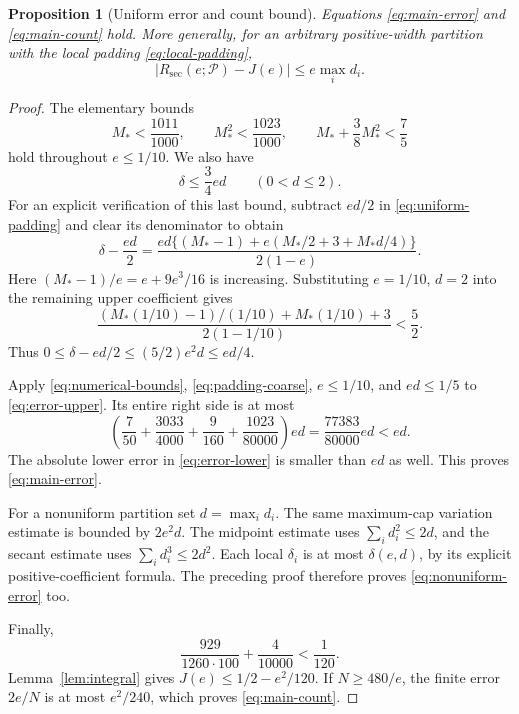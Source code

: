 \documentclass[11pt]{amsart}
\newtheorem{proposition}[theorem]{Proposition}
\theoremstyle{definition}
\theoremstyle{remark}
\newcommand{\Rsec}{R_{\mathrm{sec}}}
\begin{document}
\begin{proposition}[Uniform error and count bound]\label{prop:uniform}
Equations \eqref{eq:main-error} and \eqref{eq:main-count} hold. More
generally, for an arbitrary positive-width partition with the local
padding \eqref{eq:local-padding},
\begin{equation}\label{eq:nonuniform-error}
 |\Rsec(e;\mathcal P)-J(e)|\le e\max_i d_i.
\end{equation}
\end{proposition}
\begin{proof}
The elementary bounds
\begin{equation}\label{eq:numerical-bounds}
 M_*<\frac{1011}{1000},\qquad M_*^2<\frac{1023}{1000},
 \qquad M_*+\frac38M_*^2<\frac75
\end{equation}
hold throughout $e\le1/10$. We also have
\begin{equation}\label{eq:padding-coarse}
 \delta\le\frac34ed\qquad(0<d\le2).
\end{equation}
For an explicit verification of this last bound, subtract $ed/2$ in
\eqref{eq:uniform-padding} and clear its denominator to obtain
\[
 \delta-\frac{ed}{2}
 =\frac{ed\{(M_*-1)+e(M_*/2+3+M_*d/4)\}}{2(1-e)}.
\]
Here $(M_*-1)/e=e+9e^3/16$ is increasing. Substituting
$e=1/10$, $d=2$ into the remaining upper coefficient gives
\[
 \frac{(M_*(1/10)-1)/(1/10)+M_*(1/10)+3}{2(1-1/10)}
 <\frac52.
\]
Thus $0\le\delta-ed/2\le(5/2)e^2d\le ed/4$.

Apply \eqref{eq:numerical-bounds}, \eqref{eq:padding-coarse},
$e\le1/10$, and $ed\le1/5$ to \eqref{eq:error-upper}. Its entire
right side is at most
\[
 \left(\frac7{50}+\frac{3033}{4000}
       +\frac9{160}+\frac{1023}{80000}\right)ed
 =\frac{77383}{80000}ed<ed.
\]
The absolute lower error in \eqref{eq:error-lower} is smaller than
$ed$ as well. This proves \eqref{eq:main-error}.

For a nonuniform partition set $d=\max_i d_i$. The same maximum-cap
variation estimate is bounded by $2e^2d$. The midpoint estimate uses
$\sum_i d_i^2\le2d$, and the secant estimate uses
$\sum_i d_i^3\le2d^2$. Each local $\delta_i$ is at most
$\delta(e,d)$, by its explicit positive-coefficient formula. The preceding
proof therefore proves \eqref{eq:nonuniform-error} too.

Finally,
\[
 \frac{929}{1260\cdot100}+\frac4{10000}<\frac1{120}.
\]
Lemma~\ref{lem:integral} gives $J(e)\le1/2-e^2/120$.
If $N\ge480/e$, the finite error $2e/N$ is at most $e^2/240$,
which proves \eqref{eq:main-count}.
\end{proof}
\end{document}
